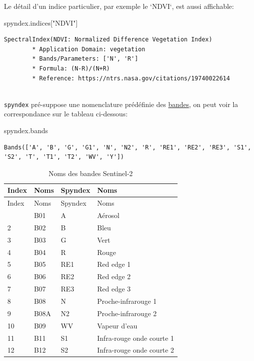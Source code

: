 \documentclass[
  french,
  11pt,
  letterpaper,
  open=any,
  twoside=false,
  french]{scrbook}
\newenvironment{Shaded}{\begin{snugshade}}{\end{snugshade}}
\newcommand{\NormalTok}[1]{\textcolor[rgb]{0.00,0.23,0.31}{#1}}
\newcommand{\StringTok}[1]{\textcolor[rgb]{0.13,0.47,0.30}{#1}}
\begin{document}
Le détail d'un indice particulier, par exemple le `NDVI`, est aussi
affichable:

\begin{Shaded}
\begin{Highlighting}[]
\NormalTok{spyndex.indices[}\StringTok{"NDVI"}\NormalTok{]}
\end{Highlighting}
\end{Shaded}

\begin{verbatim}
SpectralIndex(NDVI: Normalized Difference Vegetation Index)
        * Application Domain: vegetation
        * Bands/Parameters: ['N', 'R']
        * Formula: (N-R)/(N+R)
        * Reference: https://ntrs.nasa.gov/citations/19740022614
        
\end{verbatim}

\texttt{spyndex} pré-suppose une nomenclature prédéfinie des
\href{https://awesome-ee-spectral-indices.readthedocs.io/en/latest/\#expressions}{bandes},
on peut voir la correspondance sur le tableau ci-dessous:

\begin{Shaded}
\begin{Highlighting}[]
\NormalTok{spyndex.bands}
\end{Highlighting}
\end{Shaded}

\begin{verbatim}
Bands(['A', 'B', 'G', 'G1', 'N', 'N2', 'R', 'RE1', 'RE2', 'RE3', 'S1', 'S2', 'T', 'T1', 'T2', 'WV', 'Y'])
\end{verbatim}

\begin{longtable}[]{@{}llll@{}}
\caption{Noms des bandes Sentinel-2}\tabularnewline
\toprule\noalign{}
Index & Noms & Spyndex & Noms \\
\midrule\noalign{}
\endfirsthead
\toprule\noalign{}
Index & Noms & Spyndex & Noms \\
\midrule\noalign{}
\endhead
\bottomrule\noalign{}
\endlastfoot
1 & B01 & A & Aérosol \\
2 & B02 & B & Bleu \\
3 & B03 & G & Vert \\
4 & B04 & R & Rouge \\
5 & B05 & RE1 & Red edge 1 \\
6 & B06 & RE2 & Red edge 2 \\
7 & B07 & RE3 & Red edge 3 \\
8 & B08 & N & Proche-infrarouge 1 \\
9 & B08A & N2 & Proche-infrarouge 2 \\
10 & B09 & WV & Vapeur d'eau \\
11 & B11 & S1 & Infra-rouge onde courte 1 \\
12 & B12 & S2 & Infra-rouge onde courte 2 \\
\end{longtable}
\end{document}
